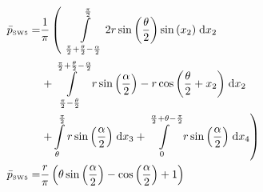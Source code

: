 \begin{align}
    \bar{p}_{\text{\tiny{SW5}}} =&\frac{1}{\pi} \left(\;\;\int\limits_{\frac{\pi}{2} + \frac{\theta}{2} - \frac{\alpha}{2}}^{\frac{\pi}{2}}2 r \sin{\left (\frac{\theta}{2} \right )} \sin{\left (x_{2} \right )}\;\mathrm{d}x_{2}\right.\notag\\
 &\left.+\int\limits_{\frac{\pi}{2} - \frac{\theta}{2}}^{\frac{\pi}{2} + \frac{\theta}{2} - \frac{\alpha}{2}}r \sin{\left (\frac{\alpha}{2} \right )} - r \cos{\left (\frac{\theta}{2} + x_{2} \right )}\;\mathrm{d}x_{2}\right.\notag\\
 &\left.+\int\limits_{\theta}^{\frac{\pi}{2}}r \sin{\left (\frac{\alpha}{2} \right )}\;\mathrm{d}x_{3}+\int\limits_{0}^{\frac{\alpha}{2} + \theta - \frac{\pi}{2}}r \sin{\left (\frac{\alpha}{2} \right )}\;\mathrm{d}x_{4}\right)\label{pSW5Def}\\
    \bar{p}_{\text{\tiny{SW5}}}  =& \frac{r}{\pi} \left(\theta \sin{\left (\frac{\alpha}{2} \right )} - \cos{\left (\frac{\alpha}{2} \right )} + 1\right)\label{pSW5Sln}
\end{align}
